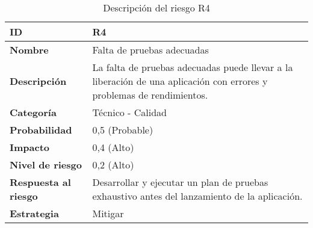 \begin{table}[H]
	\centering
	\begin{tabular}{|l|m{12cm}|}
		\hline
		\textbf{ID}                  & R4                                                                                                                    \\
		\hline
		\textbf{Nombre}              & Falta de pruebas adecuadas                                                                                            \\
		\hline
		\textbf{Descripción}         & La falta de pruebas adecuadas puede llevar a la liberación de una aplicación con errores y problemas de rendimientos. \\
		\hline
		\textbf{Categoría}           & Técnico - Calidad                                                                                                     \\
		\hline
		\textbf{Probabilidad}        & 0,5 (Probable)                                                                                                        \\
		\hline
		\textbf{Impacto}             & 0,4 (Alto)                                                                                                            \\
		\hline
		\textbf{Nivel de riesgo}     & 0,2 (Alto)                                                                                                            \\
		\hline
		\textbf{Respuesta al riesgo} & Desarrollar y ejecutar un plan de pruebas exhaustivo antes del lanzamiento de la aplicación.                          \\
		\hline
		\textbf{Estrategia}          & Mitigar                                                                                                               \\
		\hline
	\end{tabular}
	\caption{Descripción del riesgo R4}
\end{table}

\vspace{0.5cm}

